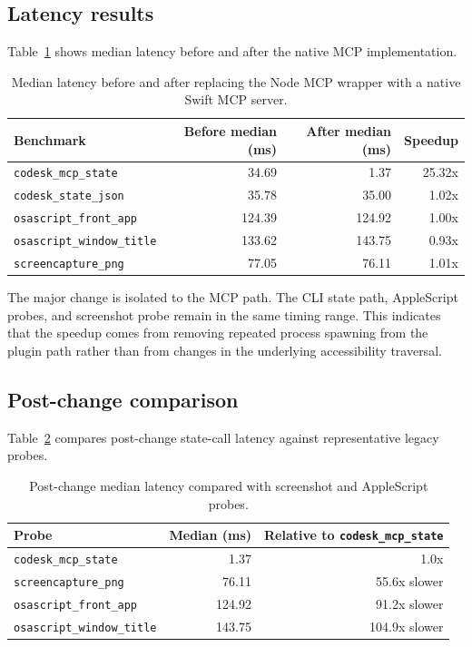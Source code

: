 \documentclass[11pt]{article}
\begin{document}
\subsection{Latency results}

Table~\ref{tab:latency-before-after} shows median latency before and after the native MCP implementation.

\begin{table}[h]
\centering
\begin{tabular}{lrrr}
\toprule
Benchmark & Before median (ms) & After median (ms) & Speedup \\
\midrule
\texttt{codesk\_mcp\_state} & 34.69 & 1.37 & 25.32x \\
\texttt{codesk\_state\_json} & 35.78 & 35.00 & 1.02x \\
\texttt{osascript\_front\_app} & 124.39 & 124.92 & 1.00x \\
\texttt{osascript\_window\_title} & 133.62 & 143.75 & 0.93x \\
\texttt{screencapture\_png} & 77.05 & 76.11 & 1.01x \\
\bottomrule
\end{tabular}
\caption{Median latency before and after replacing the Node MCP wrapper with a native Swift MCP server.}
\label{tab:latency-before-after}
\end{table}

The major change is isolated to the MCP path. The CLI state path, AppleScript probes, and screenshot probe remain in the same timing range. This indicates that the speedup comes from removing repeated process spawning from the plugin path rather than from changes in the underlying accessibility traversal.

\subsection{Post-change comparison}

Table~\ref{tab:post-change} compares post-change state-call latency against representative legacy probes.

\begin{table}[h]
\centering
\begin{tabular}{lrr}
\toprule
Probe & Median (ms) & Relative to \texttt{codesk\_mcp\_state} \\
\midrule
\texttt{codesk\_mcp\_state} & 1.37 & 1.0x \\
\texttt{screencapture\_png} & 76.11 & 55.6x slower \\
\texttt{osascript\_front\_app} & 124.92 & 91.2x slower \\
\texttt{osascript\_window\_title} & 143.75 & 104.9x slower \\
\bottomrule
\end{tabular}
\caption{Post-change median latency compared with screenshot and AppleScript probes.}
\label{tab:post-change}
\end{table}
\end{document}
